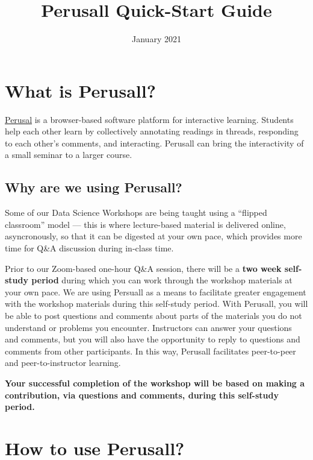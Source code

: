 \documentclass[]{book}
\title{Perusall Quick-Start Guide}
\author{}
\date{\vspace{-2.5em}January 2021}
\begin{document}
\maketitle

{
\setcounter{tocdepth}{1}
\tableofcontents
}
\hypertarget{what-is-perusall}{%
\chapter*{What is Perusall?}\label{what-is-perusall}}

\href{https://perusall.com/}{Perusal} is a browser-based software platform for interactive learning. Students help each other learn by collectively annotating readings in threads, responding to each other's comments, and interacting. Perusall can bring the interactivity of a small seminar to a larger course.

\hypertarget{why-are-we-using-perusall}{%
\section*{Why are we using Perusall?}\label{why-are-we-using-perusall}}

Some of our Data Science Workshops are being taught using a ``flipped classroom'' model --- this is where lecture-based material is delivered online, asyncronously, so that it can be digested at your own pace, which provides more time for Q\&A discussion during in-class time.

Prior to our Zoom-based one-hour Q\&A session, there will be a \textbf{two week self-study period} during which you can work through the workshop materials at your own pace. We are using Persuall as a means to facilitate greater engagement with the workshop materials during this self-study period. With Perusall, you will be able to post questions and comments about parts of the materials you do not understand or problems you encounter. Instructors can answer your questions and comments, but you will also have the opportunity to reply to questions and comments from other participants. In this way, Perusall facilitates peer-to-peer and peer-to-instructor learning.

\textbf{Your successful completion of the workshop will be based on making a contribution, via questions and comments, during this self-study period.}

\hypertarget{how-to-use-perusall}{%
\chapter*{How to use Perusall?}\label{how-to-use-perusall}}
\end{document}
